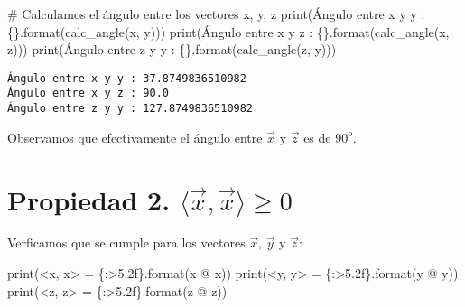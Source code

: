 \documentclass[
  letterpaper,
  DIV=11,
  numbers=noendperiod]{scrreprt}
\newenvironment{Shaded}{\begin{snugshade}}{\end{snugshade}}
\newcommand{\BuiltInTok}[1]{\textcolor[rgb]{0.00,0.23,0.31}{#1}}
\newcommand{\CommentTok}[1]{\textcolor[rgb]{0.37,0.37,0.37}{#1}}
\newcommand{\NormalTok}[1]{\textcolor[rgb]{0.00,0.23,0.31}{#1}}
\newcommand{\OperatorTok}[1]{\textcolor[rgb]{0.37,0.37,0.37}{#1}}
\newcommand{\SpecialCharTok}[1]{\textcolor[rgb]{0.37,0.37,0.37}{#1}}
\newcommand{\StringTok}[1]{\textcolor[rgb]{0.13,0.47,0.30}{#1}}
\begin{document}
\begin{Shaded}
\begin{Highlighting}[]
\CommentTok{\# Calculamos el ángulo entre los vectores x, y, z}
\BuiltInTok{print}\NormalTok{(}\StringTok{\textquotesingle{}Ángulo entre x y y : }\SpecialCharTok{\{\}}\StringTok{\textquotesingle{}}\NormalTok{.}\BuiltInTok{format}\NormalTok{(calc\_angle(x, y)))}
\BuiltInTok{print}\NormalTok{(}\StringTok{\textquotesingle{}Ángulo entre x y z : }\SpecialCharTok{\{\}}\StringTok{\textquotesingle{}}\NormalTok{.}\BuiltInTok{format}\NormalTok{(calc\_angle(x, z)))}
\BuiltInTok{print}\NormalTok{(}\StringTok{\textquotesingle{}Ángulo entre z y y : }\SpecialCharTok{\{\}}\StringTok{\textquotesingle{}}\NormalTok{.}\BuiltInTok{format}\NormalTok{(calc\_angle(z, y)))}
\end{Highlighting}
\end{Shaded}

\begin{verbatim}
Ángulo entre x y y : 37.8749836510982
Ángulo entre x y z : 90.0
Ángulo entre z y y : 127.8749836510982
\end{verbatim}

Observamos que efectivamente el ángulo entre \(\vec{x}\) y \(\vec{z}\)
es de \(90^o\).

\section{\texorpdfstring{Propiedad 2.
\(\langle \vec{x}, \vec{x} \rangle \ge 0\)}{Propiedad 2. \textbackslash langle \textbackslash vec\{x\}, \textbackslash vec\{x\} \textbackslash rangle \textbackslash ge 0}}\label{propiedad-2.-langle-vecx-vecx-rangle-ge-0}

Verficamos que se cumple para los vectores \(\vec{x}\), \(\vec{y}\) y
\(\vec{z}\):

\begin{Shaded}
\begin{Highlighting}[]
\BuiltInTok{print}\NormalTok{(}\StringTok{\textquotesingle{}\textless{}x, x\textgreater{} = }\SpecialCharTok{\{:\textgreater{}5.2f\}}\StringTok{\textquotesingle{}}\NormalTok{.}\BuiltInTok{format}\NormalTok{(x }\OperatorTok{@}\NormalTok{ x))}
\BuiltInTok{print}\NormalTok{(}\StringTok{\textquotesingle{}\textless{}y, y\textgreater{} = }\SpecialCharTok{\{:\textgreater{}5.2f\}}\StringTok{\textquotesingle{}}\NormalTok{.}\BuiltInTok{format}\NormalTok{(y }\OperatorTok{@}\NormalTok{ y))}
\BuiltInTok{print}\NormalTok{(}\StringTok{\textquotesingle{}\textless{}z, z\textgreater{} = }\SpecialCharTok{\{:\textgreater{}5.2f\}}\StringTok{\textquotesingle{}}\NormalTok{.}\BuiltInTok{format}\NormalTok{(z }\OperatorTok{@}\NormalTok{ z))}
\end{Highlighting}
\end{Shaded}
\end{document}
